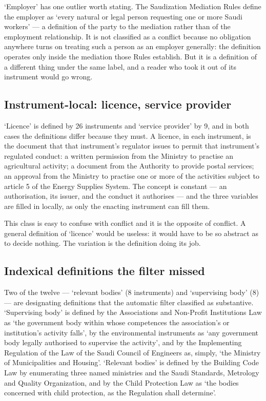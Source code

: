 \documentclass[11pt]{article}
\begin{document}
`Employer' has one outlier worth stating. The Saudization Mediation Rules
define the employer as `every natural or legal person requesting one or more
Saudi workers' --- a definition of the party to the mediation rather than of
the employment relationship. It is not classified as a conflict because no
obligation anywhere turns on treating such a person as an employer
generally: the definition operates only inside the mediation those Rules
establish. But it is a definition of a different thing under the same label,
and a reader who took it out of its instrument would go wrong.

\subsection{Instrument-local: licence, service provider}

`Licence' is defined by 26 instruments and `service provider' by 9, and in
both cases the definitions differ because they must. A licence, in each
instrument, is the document that that instrument's regulator issues to permit
that instrument's regulated conduct: a written permission from the Ministry
to practise an agricultural activity; a document from the Authority to
provide postal services; an approval from the Ministry to practise one or
more of the activities subject to article 5 of the Energy Supplies System.
The concept is constant --- an authorisation, its issuer, and the conduct it
authorises --- and the three variables are filled in locally, as only the
enacting instrument can fill them.

This class is easy to confuse with conflict and it is the opposite of
conflict. A general definition of `licence' would be useless: it would have
to be so abstract as to decide nothing. The variation is the definition doing
its job.

\subsection{Indexical definitions the filter missed}
\label{sec:missed}

Two of the twelve --- `relevant bodies' (8 instruments) and `supervising
body' (8) --- are designating definitions that the automatic filter
classified as substantive. `Supervising body' is defined by the Associations
and Non-Profit Institutions Law as `the government body within whose
competences the association's or institution's activity falls', by the
environmental instruments as `any government body legally authorised to
supervise the activity', and by the Implementing Regulation of the Law of the
Saudi Council of Engineers as, simply, `the Ministry of Municipalities and
Housing'. `Relevant bodies' is defined by the Building Code Law by
enumerating three named ministries and the Saudi Standards, Metrology and
Quality Organization, and by the Child
Protection Law as `the bodies concerned with child protection, as the
Regulation shall determine'.
\end{document}
